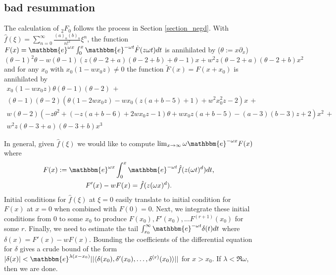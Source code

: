 \documentclass[12pt]{article}
\newcommand{\ee}[0] {\mathbbm{e}}
\numberwithin{equation}{section}
\begin{document}
\subsection{bad resummation}
The calculation of ${}_2 F_0$ follows the process in Section \ref{section_negd}. With $\hat{f}(\xi) = \sum_{n=0}^{\infty} \frac{(a)_n (b)_n}{n!^2} \xi^n$, the function $F(x) = \ee^{\omega x} \int_0^x \ee^{-\omega t} \hat{F}(z \omega t) dt$ is annihilated by ($\theta := x \partial_x$)
\begin{equation*}
(\theta -1)^2 \theta - w (\theta -1)(z (\theta -2+a)
   (\theta -2+b)+\theta -1) x + w^2 z (\theta -2+a) (\theta -2+b) x^2
\end{equation*}
and for any $x_0$ with $x_0 \left(1-w x_0 z\right)\neq 0$ the function $\tilde{F}(x) = F(x+x_0)$ is annihilated by
\begin{gather*}
x_0 \left(1-w x_0 z\right)\theta (\theta -1)(\theta -2)\,+\\
(\theta-1) (\theta-2) \left(\theta  \left(1-2 w x_0 z\right)-w x_0 (z (a+b-5)+1)+w^2 x_0^2 z-2\right)x \,+\\
w (\theta -2)
   \left(-z \theta ^2+\left(-z(a+b-6)+2 w x_0 z-1\right)\theta+w x_0 z (a+b-5)-(a-3)
   (b-3) z+2\right) x^2\,+\\
w^2 z (\theta-3+a) (\theta-3+b) x^3
\end{gather*}

In general, given $\hat{f}(\xi)$ we would like to compute $\lim_{x \to \infty} \omega \ee^{-\omega x}F(x)$ where
\begin{gather*}
F(x) := \ee^{\omega x} \int_0^x \ee^{-\omega t} \hat{f}(z (\omega t)^d) dt\text{,}\\
F'(x) - w F(x) = \hat{f}(z (\omega x)^d)\text{.}
\end{gather*}
Initial conditions for $\hat{f}(\xi)$ at $\xi=0$ easily translate to initial condition for $F(x)$ at $x=0$ when combined with $F(0) = 0$. Next, we integrate these initial conditions from $0$ to some $x_0$ to produce $F(x_0), F'(x_0), \dots F^{(r+1)}(x_0)$ for some $r$. Finally, we need to estimate the tail $\int_{x_0}^{\infty} \ee^{-\omega t} \delta(t) dt$ where $\delta(x) = F'(x) - w F(x)$. Bounding the coefficients of the differential equation for $\delta$ gives a crude bound of the form $|\delta(x)| < \ee^{\lambda (x-x_0)} || \langle \delta(x_0), \delta'(x_0), \dots, \delta^{(r)}(x_0) \rangle ||$ for $x>x_0$. If $\lambda < \Re \omega$, then we are done.
\end{document}
